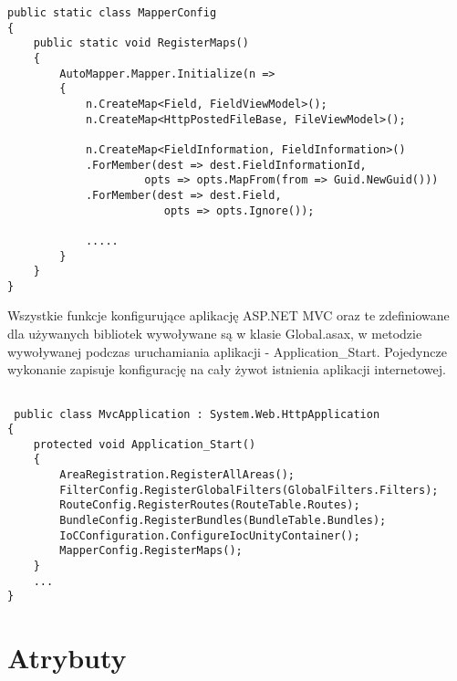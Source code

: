 \begin{lstlisting}[caption=Konfiguracja biblioteki Automapper]
public static class MapperConfig
{
	public static void RegisterMaps()
	{
		AutoMapper.Mapper.Initialize(n =>
		{
			n.CreateMap<Field, FieldViewModel>();
			n.CreateMap<HttpPostedFileBase, FileViewModel>();
			
			n.CreateMap<FieldInformation, FieldInformation>()
			.ForMember(dest => dest.FieldInformationId,
					 opts => opts.MapFrom(from => Guid.NewGuid()))
			.ForMember(dest => dest.Field, 
						opts => opts.Ignore());
						
			.....
		}
	}
}

\end{lstlisting}

Wszystkie funkcje konfigurujące aplikację ASP.NET MVC oraz te zdefiniowane dla używanych bibliotek wywoływane są w klasie Global.asax, w metodzie wywoływanej podczas uruchamiania aplikacji - Application\_Start. Pojedyncze wykonanie zapisuje konfigurację na cały żywot istnienia aplikacji internetowej. 


\begin{lstlisting}[caption=Konfiguracja aplikacji]

 public class MvcApplication : System.Web.HttpApplication
{
	protected void Application_Start()
	{
		AreaRegistration.RegisterAllAreas();
		FilterConfig.RegisterGlobalFilters(GlobalFilters.Filters);
		RouteConfig.RegisterRoutes(RouteTable.Routes);
		BundleConfig.RegisterBundles(BundleTable.Bundles);
		IoCConfiguration.ConfigureIocUnityContainer();
		MapperConfig.RegisterMaps();
	}
	...
}
\end{lstlisting}

\section{Atrybuty}

